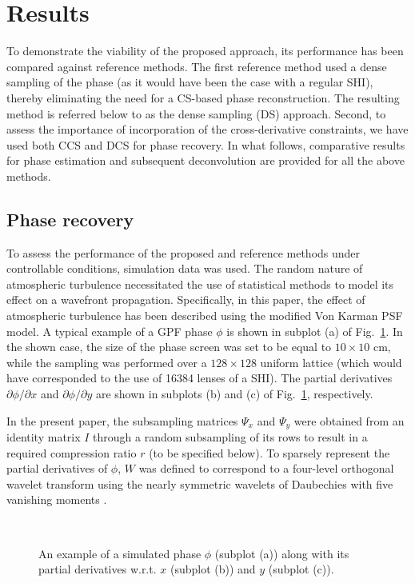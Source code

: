 \pdfoutput=1 \documentclass[journal]{IEEEtran}
\begin{document}
\section{Results}
To demonstrate the viability of the proposed approach, its performance has been compared against reference methods. The first reference method used a dense sampling of the phase (as it would have been the case with a regular SHI), thereby eliminating the need for a CS-based phase reconstruction. The resulting method is referred below to as the dense sampling (DS) approach. Second, to assess the importance of incorporation of the cross-derivative constraints, we have used both CCS and DCS for phase recovery. In what follows, comparative results for phase estimation and subsequent deconvolution are provided for all the above methods.

\subsection{Phase recovery}
To assess the performance of the proposed and reference methods under controllable conditions, simulation data was used. The random nature of atmospheric turbulence necessitated the use of statistical methods to model its effect on a wavefront propagation. Specifically, in this paper, the effect of atmospheric turbulence has been described using the modified Von Karman PSF model\cite{35}. A typical example of a GPF phase $\phi$ is shown in subplot (a) of Fig.~\ref{F3}. In the shown case, the size of the phase screen was set to be equal to $10 \times 10$ cm, while the sampling was performed over a $128 \times 128$ uniform lattice (which would have corresponded to the use of 16384 lenses of a SHI). The partial derivatives $\partial \phi / \partial x$ and $\partial \phi / \partial y$ are shown in subplots (b) and (c) of Fig.~\ref{F3}, respectively.

In the present paper, the subsampling matrices $\Psi_x$ and $\Psi_y$ were obtained from an identity matrix $I$ through a random subsampling of its rows to result in a required compression ratio $r$ (to be specified below). To sparsely represent the partial derivatives of $\phi$, $W$ was defined to correspond to a four-level orthogonal wavelet transform using the nearly symmetric wavelets of Daubechies with five vanishing moments \cite{92}.

\begin{figure}[t]
\centering
{}
\\
\caption{An example of a simulated phase $\phi$ (subplot (a)) along with its partial derivatives w.r.t. $x$ (subplot (b)) and $y$ (subplot (c)).}
\label{F3}
\end{figure}
\end{document}
